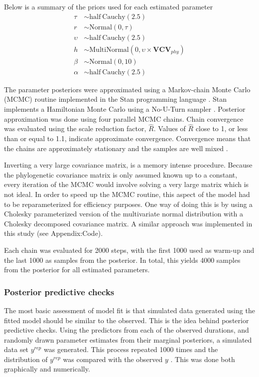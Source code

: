 \documentclass[12pt,letterpaper]{article}
\begin{document}
Below is a summary of the priors used for each estimated parameter 
\begin{align*}
  \tau &\sim \mathrm{half\ Cauchy}(2.5) \\
  r &\sim \mathrm{Normal}(0, \tau) \\
  \upsilon &\sim \mathrm{half\ Cauchy}(2.5) \\
  h &\sim \mathrm{MultiNormal}(0, \upsilon \times \mathbf{VCV}_{phy}) \\
  \beta &\sim \mathrm{Normal}(0, 10) \\
  \alpha &\sim \mathrm{half\ Cauchy}(2.5)
\end{align*}


The parameter posteriors were approximated using a Markov-chain Monte Carlo (MCMC) routine implemented in the Stan programming language \citep{2014stan}. Stan implements a Hamiltonian Monte Carlo using a No-U-Turn sampler \citep{Hoffman-Gelman:2011}. Posterior approximation was done using four parallel MCMC chains. Chain convergence was evaluated using the scale reduction factor, \(\hat{R}\). Values of \(\hat{R}\) close to 1, or less than or equal to 1.1, indicate approximate convergence. Convergence means that the chains are approximately stationary and the samples are well mixed \citep{Gelman2013d}.

Inverting a very large covariance matrix, is a memory intense procedure. Because the phylogenetic covariance matrix is only assumed known up to a constant, every iteration of the MCMC would involve solving a very large matrix which is not ideal. In order to speed up the MCMC routine, this aspect of the model had to be reparameterized for efficiency purposes. One way of doing this is by using a Cholesky parameterized version of the multivariate normal distribution with a Cholesky decomposed covariance matrix. A similar approach was implemented in this study (see Appendix:Code).

Each chain was evaluated for 2000 steps, with the first 1000 used as warm-up and the last 1000 as samples from the posterior. In total, this yields 4000 samples from the posterior for all estimated parameters. 


\subsubsection{Posterior predictive checks}

The most basic assessment of model fit is that simulated data generated using the fitted model should be similar to the observed. This is the idea behind posterior predictive checks. Using the predictors from each of the observed durations, and randomly drawn parameter estimates from their marginal posteriors, a simulated data set \(y^{rep}\) was generated. This process repeated 1000 times and the distribution of \(y^{rep}\) was compared with the observed \(y\) \citep{Gelman2013d}. This was done both graphically and numerically.
\end{document}
